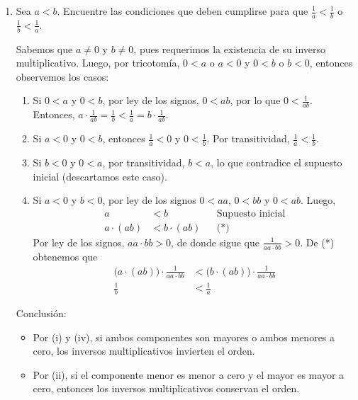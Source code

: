 \documentclass[11pt]{article}
\begin{document}
\begin{enumerate}[label=\alph*)]
    \item Sea $a<b$. Encuentre las condiciones que deben cumplirse para que $\frac{1}{a}<\frac{1}{b}$ o $\frac{1}{b}<\frac{1}{a}$.
    
    Sabemos que $a\neq 0$ y $b\neq 0$, pues requerimos la existencia de su inverso multiplicativo. Luego, por tricotomía, $0<a$ o $a<0$ y $0<b$ o $b<0$, entonces observemos los casos: \begin{enumerate}[label=\roman*)]
        \item Si $0<a$ y $0<b$, por ley de los signos, $0<ab$, por lo que $0<\frac{1}{ab}$. Entonces, $a\cdot \frac{1}{ab} = \frac{1}{b} < \frac{1}{a} = b \cdot \frac{1}{ab}$.
        \item Si $a<0$ y $0<b$, entonces $\frac{1}{a}<0$ y $0<\frac{1}{b}$. Por transitividad, $\frac{1}{a}<\frac{1}{b}$.
        \item Si $b<0$ y $0<a$, por transitividad, $b<a$, lo que contradice el supuesto inicial (descartamos este caso).
        \item Si $a<0$ y $b<0$, por ley de los signos $0<a a$, $0<b b$ y $0<ab$. Luego,\begin{align*}
            a &< b && \text{Supuesto inicial}\\
            a \cdot (ab) &< b \cdot (ab) && \text{(*)}
        \end{align*} Por ley de los signos, $aa\cdot bb>0$, de donde sigue que $\frac{1}{aa\cdot bb}>0$. De (*) obtenemos que \begin{align*}
            \bigl(a \cdot (ab)\bigr) \cdot \frac{1}{aa\cdot bb} &< \bigl(b \cdot (ab)\bigr)\cdot \frac{1}{aa\cdot bb}\\
            \frac{1}{b} &< \frac{1}{a}
        \end{align*}
    \end{enumerate}
    Conclusión: \begin{itemize}
        \item Por (i) y (iv), si ambos componentes son mayores o ambos menores a cero, los inversos multiplicativos invierten el orden.%
        \item Por (ii), si el componente menor es menor a cero y el mayor es mayor a cero, entonces los inversos multiplicativos conservan el orden.

\end{itemize}
\end{enumerate}
\end{document}
